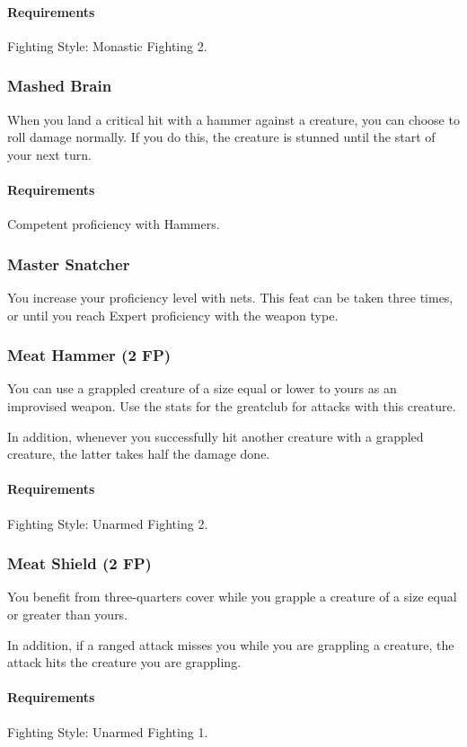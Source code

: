     \paragraph{Requirements} Fighting Style: Monastic Fighting 2.
\subsubsection{Mashed Brain} \label{feat::mashedbrain}
    When you land a critical hit with a hammer against a creature, you can choose to roll damage normally.
    If you do this, the creature is stunned until the start of your next turn.
    \paragraph{Requirements} Competent proficiency with Hammers.
\subsubsection{Master Snatcher} \label{feat::snatcher}
    You increase your proficiency level with nets.
    This feat can be taken three times, or until you reach Expert proficiency with the weapon type.
\subsubsection{Meat Hammer (2 FP)} \label{feat::meathammer}
    You can use a grappled creature of a size equal or lower to yours as an improvised weapon.
    Use the stats for the greatclub for attacks with this creature.

    In addition, whenever you successfully hit another creature with a grappled creature, the latter takes half the damage done.
    \paragraph{Requirements} Fighting Style: Unarmed Fighting 2.
\subsubsection{Meat Shield (2 FP)} \label{feat::meatshield}
    You benefit from three-quarters cover while you grapple a creature of a size equal or greater than yours.

    In addition, if a ranged attack misses you while you are grappling a creature, the attack hits the creature you are grappling.
    \paragraph{Requirements} Fighting Style: Unarmed Fighting 1.
